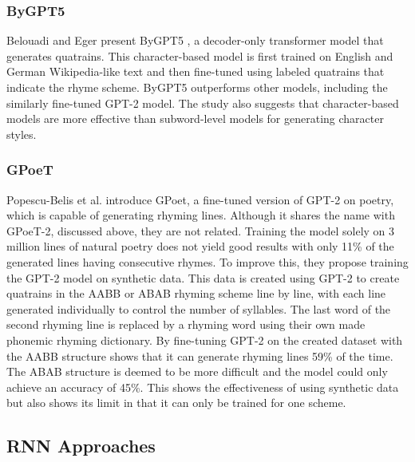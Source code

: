 \subsubsection{ByGPT5}
Belouadi and Eger present ByGPT5 \cite{belouadi_bygpt5_2023}, a decoder-only transformer model that generates quatrains. 
This character-based model is first trained on English and German Wikipedia-like text and then fine-tuned using labeled quatrains that indicate the rhyme scheme. 
ByGPT5 outperforms other models, including the similarly fine-tuned GPT-2 model. 
The study also suggests that character-based models are more effective than subword-level models for generating character styles.

\subsubsection{GPoeT}
Popescu-Belis et al. introduce GPoet\cite{popescu-belis-etal-2023-gpoet}, a fine-tuned version of GPT-2 on poetry, which is capable of generating rhyming lines. Although it shares the name with GPoeT-2, discussed above, they are not related. Training the model solely on 3 million lines of natural poetry does not yield good results with only 11\% of the generated lines having consecutive rhymes. To improve this, they propose training the GPT-2 model on synthetic data. This data is created using GPT-2 to create quatrains in the AABB or ABAB rhyming scheme line by line, with each line generated individually to control the number of syllables. The last word of the second rhyming line is replaced by a rhyming word using their own made phonemic rhyming dictionary. By fine-tuning GPT-2 on the created dataset with the AABB structure shows that it can generate rhyming lines 59\% of the time. The ABAB structure is deemed to be more difficult and the model could only achieve an accuracy of 45\%. This shows the effectiveness of using synthetic data but also shows its limit in that it can only be trained for one scheme. 





\subsection{RNN Approaches}

